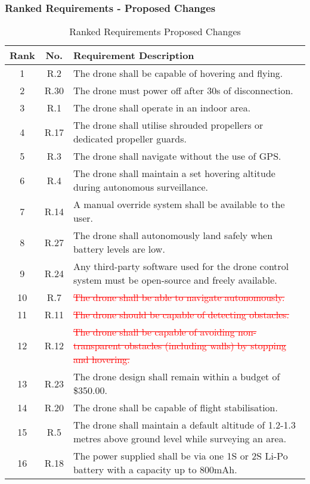 \subsubsection{Ranked Requirements - Proposed Changes}

\begin{table}[H]
\centering
\caption{Ranked Requirements Proposed Changes}
\begin{tabular}{|c|c|p{11cm}|}
\hline
\textbf{Rank} & \textbf{No.} & \textbf{Requirement Description} \\ \hline
1 & R.2 & The drone shall be capable of hovering and flying. \\ \hline
2 & R.30 & The drone must power off after 30s of disconnection. \\ \hline
3 & R.1 & The drone shall operate in an indoor area. \\ \hline
4 & R.17 & The drone shall utilise shrouded propellers or dedicated propeller guards. \\ \hline
5 & R.3 & The drone shall navigate without the use of GPS. \\ \hline
6 & R.4 & The drone shall maintain a set hovering altitude during autonomous surveillance. \\ \hline
7 & R.14 & A manual override system shall be available to the user. \\ \hline
8 & R.27 & The drone shall autonomously land safely when battery levels are low. \\ \hline
9 & R.24 & Any third-party software used for the drone control system must be open-source and freely available. \\ \hline
10 & R.7 & \textcolor{red}{\sout{The drone shall be able to navigate autonomously.}} \\ \hline
11 & R.11 & \textcolor{red}{\sout{The drone should be capable of detecting obstacles.}} \\ \hline
12 & R.12 & \textcolor{red}{\sout{The drone shall be capable of avoiding non-transparent obstacles (including walls) by stopping and hovering.}} \\ \hline
13 & R.23 & The drone design shall remain within a budget of \$350.00. \\ \hline
14 & R.20 & The drone shall be capable of flight stabilisation. \\ \hline
15 & R.5 & The drone shall maintain a default altitude of 1.2-1.3 metres above ground level while surveying an area. \\ \hline
16 & R.18 & The power supplied shall be via one 1S or 2S Li-Po battery with a capacity up to 800mAh. \\ \hline

\end{tabular}
\end{table}
